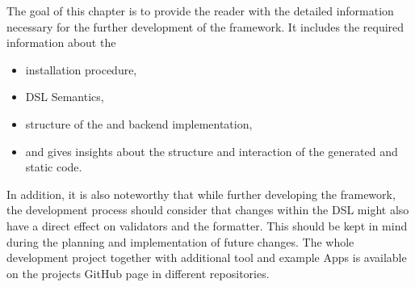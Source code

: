 

The goal of this chapter is to provide the reader with the detailed information necessary for the further development of the \MD framework. It includes the required information about the 

\begin{itemize}
	\item installation procedure,
	\item DSL Semantics,
	\item structure of the \mapapps and backend implementation,
	\item and  gives insights about the structure and interaction of the generated and static code.
\end{itemize}

In addition, it is also noteworthy that while further developing the framework, the development process should consider that changes within the DSL might also have a direct effect on validators and the formatter. This should be kept in mind during the planning and implementation of future changes. The whole development project together with additional tool and example Apps is available on the projects GitHub page in different repositories.